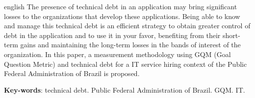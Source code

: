 \begin{resumo}[Abstract]
 \begin{otherlanguage*}{english}
	The presence of technical debt in an application may bring significant losses to the organizations that develop these applications. Being able to know and manage this technical debt is an efficient strategy to obtain greater control of debt in the application and to use it in your favor, benefiting from their short-term gains and maintaining the long-term losses in the bands of interest of the organization. In this paper, a measurement methodology using GQM (Goal Question Metric) and technical debt for a IT service hiring context of the Public Federal Administration of Brazil is proposed. 

   \vspace{\onelineskip}
 
   \noindent 
   \textbf{Key-words}: technical debt. Public Federal Administration of Brazil. GQM. IT.
 \end{otherlanguage*}
\end{resumo}
